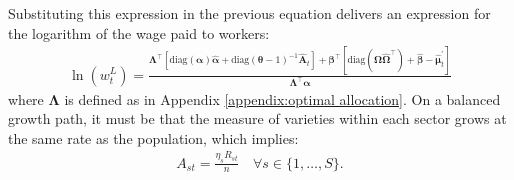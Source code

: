 \documentclass[12pt]{article}
\begin{document}
Substituting this expression in the previous equation delivers an expression for the logarithm of the wage paid to workers:
\begin{align*}
\ln(w_t^L) = \frac{\bm{\Lambda}^{\top} [\text{diag}(\bm{\alpha}) \hat{\bm{\alpha}} + \text{diag}(\bm{\theta} - 1)^{-1} \hat{\mathbf{A}}_t] + \bm{\beta}^{\top} [\text{diag}(\bm{\Omega} \hat{\bm{\Omega}}^{\top}) + \hat{\bm{\beta}} - \hat{\bm{\mu}}_t^{\prime}]}{\bm{\Lambda}^{\top} \bm{\alpha}}
\end{align*}
where $\bm{\Lambda}$ is defined as in Appendix \ref{appendix:optimal allocation}. On a balanced growth path, it must be that the measure of varieties within each sector grows at the same rate as the population, which implies:
\begin{align*}
A_{st} = \frac{\eta_s R_{st}}{n} \quad \forall s \in \{1, \ldots, S\}.
\end{align*}



\clearpage
\end{document}
